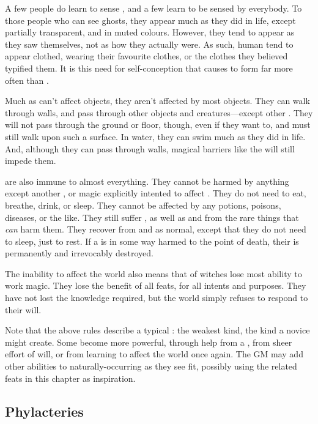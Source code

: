 A few people do learn to sense {\ghosts}, and a few {\ghosts} learn to be sensed by everybody.
To those people who can see ghosts, they appear much as they did in life, except partially transparent, and in muted colours.
However, they tend to appear as they saw themselves, not as how they actually were.
As such, human {\ghosts} tend to appear clothed, wearing their favourite clothes, or the clothes they believed typified them.
It is this need for self-conception that causes {\strongsouls} to form {\ghosts} far more often than {\weaksouls}.

Much as {\ghosts} can't affect objects, they aren't affected by most objects.
They can walk through walls, and pass through other objects and creatures---except other {\ghosts}.
They will not pass through the ground or floor, though, even if they want to, and must still walk upon such a surface.
In water, they can swim much as they did in life.
And, although they can pass through walls, magical barriers like the  will still impede them.

\capital{\ghosts} are also immune to almost everything.
They cannot be harmed by anything except another {\ghost}, or magic explicitly intented to affect {\ghosts}.
They do not need to eat, breathe, drink, or sleep.
They cannot be affected by any potions, poisons, diseases, or the like.
They still suffer {\exhaustion}, as well as {\damage} and {\shock} from the rare things that \emph{can} harm them.
They recover from {\damage} and {\exhaustion} as normal, except that they do not need to sleep, just to rest.
If a {\ghost} is in some way harmed to the point of death, their {\soul} is permanently and irrevocably destroyed.

The inability to affect the world also means that {\ghosts} of witches lose most ability to work magic.
They lose the benefit of all feats, for all intents and purposes.
They have not lost the knowledge required, but the world simply refuses to respond to their will.

Note that the above rules describe a typical {\ghost}: the weakest kind, the kind a novice  might create.
Some {\ghosts} become more powerful, through help from a , from sheer effort of will, or from learning to affect the world once again.
The GM may add other abilities to naturally-occurring {\ghosts} as they see fit, possibly using the {\ghost} related feats in this chapter as inspiration.

\subsection{Phylacteries}

